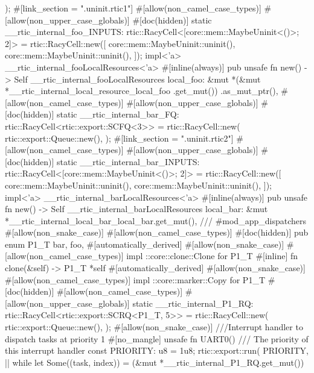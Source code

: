 {    );
    #[link_section = ".uninit.rtic1"]
    #[allow(non_camel_case_types)]
    #[allow(non_upper_case_globals)]
    #[doc(hidden)]
    static __rtic_internal_foo_INPUTS: rtic::RacyCell<[core::mem::MaybeUninit<()>; 2]> = rtic::RacyCell::new([
        core::mem::MaybeUninit::uninit(),
        core::mem::MaybeUninit::uninit(),
    ]);
    impl<'a> __rtic_internal_fooLocalResources<'a> {
        #[inline(always)]
        pub unsafe fn new() -> Self {
            __rtic_internal_fooLocalResources {
                local_foo: &mut *(&mut *__rtic_internal_local_resource_local_foo
                    .get_mut())
                    .as_mut_ptr(),
            }
        }
    }
    #[allow(non_camel_case_types)]
    #[allow(non_upper_case_globals)]
    #[doc(hidden)]
    static __rtic_internal_bar_FQ: rtic::RacyCell<rtic::export::SCFQ<3>> = rtic::RacyCell::new(
        rtic::export::Queue::new(),
    );
    #[link_section = ".uninit.rtic2"]
    #[allow(non_camel_case_types)]
    #[allow(non_upper_case_globals)]
    #[doc(hidden)]
    static __rtic_internal_bar_INPUTS: rtic::RacyCell<[core::mem::MaybeUninit<()>; 2]> = rtic::RacyCell::new([
        core::mem::MaybeUninit::uninit(),
        core::mem::MaybeUninit::uninit(),
    ]);
    impl<'a> __rtic_internal_barLocalResources<'a> {
        #[inline(always)]
        pub unsafe fn new() -> Self {
            __rtic_internal_barLocalResources {
                local_bar: &mut *__rtic_internal_local_bar_local_bar.get_mut(),
            }
        }
    }
    /// #mod_app_dispatchers
    #[allow(non_snake_case)]
    #[allow(non_camel_case_types)]
    #[doc(hidden)]
    pub enum P1_T {
        bar,
        foo,
    }
    #[automatically_derived]
    #[allow(non_snake_case)]
    #[allow(non_camel_case_types)]
    impl ::core::clone::Clone for P1_T {
        #[inline]
        fn clone(&self) -> P1_T {
            *self
        }
    }
    #[automatically_derived]
    #[allow(non_snake_case)]
    #[allow(non_camel_case_types)]
    impl ::core::marker::Copy for P1_T {}
    #[doc(hidden)]
    #[allow(non_camel_case_types)]
    #[allow(non_upper_case_globals)]
    static __rtic_internal_P1_RQ: rtic::RacyCell<rtic::export::SCRQ<P1_T, 5>> = rtic::RacyCell::new(
        rtic::export::Queue::new(),
    );
    #[allow(non_snake_case)]
    ///Interrupt handler to dispatch tasks at priority 1
    #[no_mangle]
    unsafe fn UART0() {
        /// The priority of this interrupt handler
        const PRIORITY: u8 = 1u8;
        rtic::export::run(
            PRIORITY,
            || {
                while let Some((task, index)) = (&mut *__rtic_internal_P1_RQ.get_mut())
}}}
